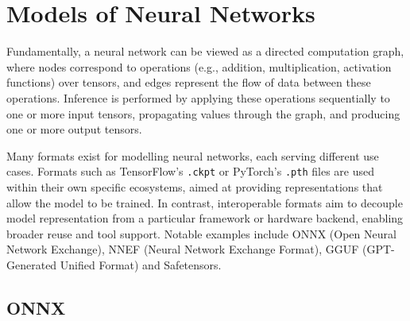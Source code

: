 \chapter{Models of Neural Networks}
\label{sec:models}
%
Fundamentally, a neural network can be viewed as a directed computation graph, where nodes correspond to operations (e.g., addition, multiplication, activation functions) over tensors, and edges represent the flow of data between these operations. Inference is performed by applying these operations sequentially to one or more input tensors, propagating values through the graph, and producing one or more output tensors.

Many formats exist for modelling neural networks, each serving different use cases. 
Formats such as TensorFlow’s \texttt{.ckpt} or PyTorch’s \texttt{.pth} files are used within their own specific ecosystems, aimed at providing representations that allow the model to be trained. 
In contrast, interoperable formats aim to decouple model representation from a particular framework or hardware backend, enabling broader reuse and tool support. 
Notable examples include ONNX (Open Neural Network Exchange), NNEF (Neural Network Exchange Format), GGUF (GPT-Generated Unified Format) and Safetensors.

\section{ONNX}
\label{sec:onnx}

